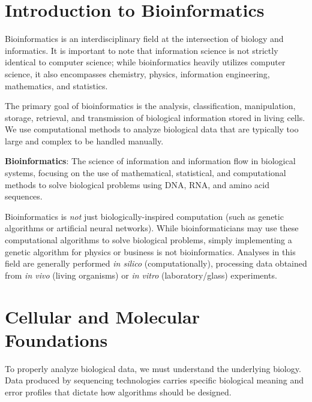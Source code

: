 
\section{Introduction to Bioinformatics}

Bioinformatics is an interdisciplinary field at the intersection of biology and informatics. It is important to note that information science is not strictly identical to computer science; while bioinformatics heavily utilizes computer science, it also encompasses chemistry, physics, information engineering, mathematics, and statistics. 

The primary goal of bioinformatics is the analysis, classification, manipulation, storage, retrieval, and transmission of biological information stored in living cells. We use computational methods to analyze biological data that are typically too large and complex to be handled manually. 

\begin{important}
  \textbf{Bioinformatics}: The science of information and information flow in biological systems, focusing on the use of mathematical, statistical, and computational methods to solve biological problems using DNA, RNA, and amino acid sequences.
\end{important}

\sta Bioinformatics is \textit{not} just biologically-inspired computation (such as genetic algorithms or artificial neural networks). While bioinformaticians may use these computational algorithms to solve biological problems, simply implementing a genetic algorithm for physics or business is not bioinformatics. Analyses in this field are generally performed \textit{in silico} (computationally), processing data obtained from \textit{in vivo} (living organisms) or \textit{in vitro} (laboratory/glass) experiments.

\section{Cellular and Molecular Foundations}

To properly analyze biological data, we must understand the underlying biology. Data produced by sequencing technologies carries specific biological meaning and error profiles that dictate how algorithms should be designed.

